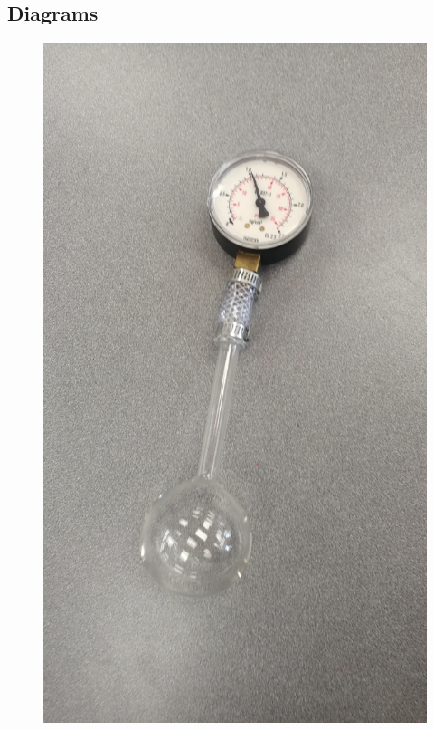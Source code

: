 \documentclass[a4paper,12pt]{article}
\begin{document}
\subsection{Diagrams}

\begin{figure}[H]
    \centering
    \begin{minipage}{.4\textwidth}
        \centering
        \includegraphics[scale=0.07]{assets/probe.jpg}
        \label{fig:probe}

\end{minipage}
\end{figure}
\end{document}

